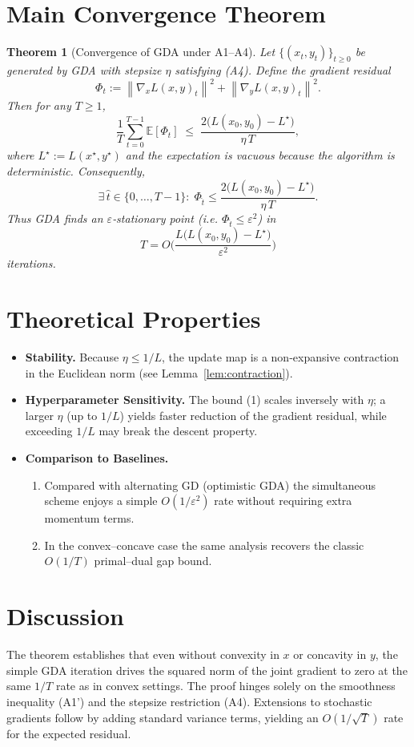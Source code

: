 \documentclass{article}
\newtheorem{theorem}{Theorem}
\newcommand{\E}{\mathbb{E}}
\newcommand{\norm}[1]{\left\|#1\right\|}
\newcommand{\gradx}{\nabla_x L(x,y)}
\newcommand{\grady}{\nabla_y L(x,y)}
\begin{document}
\section*{Main Convergence Theorem}
\begin{theorem}[Convergence of GDA under A1–A4]\label{thm:main}
Let $\{(x_t,y_t)\}_{t\ge0}$ be generated by GDA with stepsize $\eta$ satisfying (A4).  
Define the \emph{gradient residual}
\[
\Phi_t:=\norm{\gradx_t}^2+\norm{\grady_t}^2 .
\]
Then for any $T\ge1$,
\[
\frac{1}{T}\sum_{t=0}^{T-1}\E[\Phi_t]\;\le\;
\frac{2\big(L(x_0,y_0)-L^\star\big)}{\eta\,T},
\tag{1}
\]
where $L^\star:=L(x^\star,y^\star)$ and the expectation is vacuous because the algorithm is deterministic. Consequently,
\[
\exists\,\hat t\in\{0,\dots,T-1\}:\;\Phi_{\hat t}\le
\frac{2\big(L(x_0,y_0)-L^\star\big)}{\eta\,T}.
\tag{2}
\]
Thus GDA finds an $\varepsilon$‑stationary point (i.e. $\Phi_{\hat t}\le\varepsilon^2$) in
\[
T=O\!\Big(\frac{L\big(L(x_0,y_0)-L^\star\big)}{\varepsilon^2}\Big)
\]
iterations.
\end{theorem}

\section*{Theoretical Properties}
\begin{itemize}
\item \textbf{Stability.} Because $\eta\le1/L$, the update map is a non‑expansive contraction in the Euclidean norm (see Lemma~\ref{lem:contraction}).
\item \textbf{Hyperparameter Sensitivity.} The bound (1) scales inversely with $\eta$; a larger $\eta$ (up to $1/L$) yields faster reduction of the gradient residual, while exceeding $1/L$ may break the descent property.
\item \textbf{Comparison to Baselines.}
    \begin{enumerate}
        \item Compared with alternating GD (optimistic GDA) the simultaneous scheme enjoys a simple $O(1/\varepsilon^2)$ rate without requiring extra momentum terms.
        \item In the convex–concave case the same analysis recovers the classic $O(1/T)$ primal–dual gap bound.
    \end{enumerate}
\end{itemize}

\section*{Discussion}
The theorem establishes that even without convexity in $x$ or concavity in $y$, the simple GDA iteration drives the squared norm of the joint gradient to zero at the same $1/T$ rate as in convex settings. The proof hinges solely on the smoothness inequality (A1') and the stepsize restriction (A4). Extensions to stochastic gradients follow by adding standard variance terms, yielding an $O(1/\sqrt{T})$ rate for the expected residual.
\end{document}
